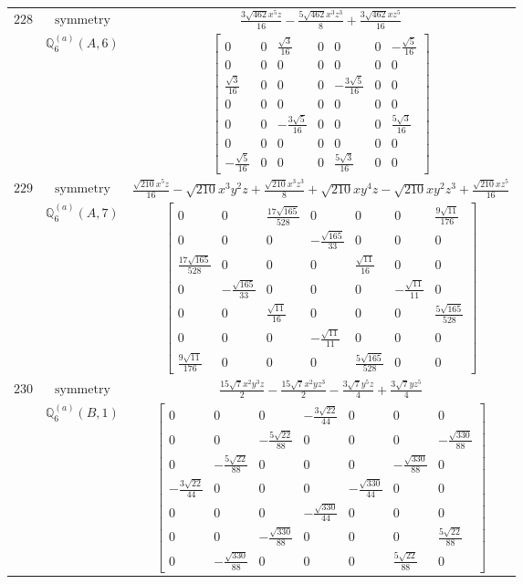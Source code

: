 \documentclass[fleqn,8pt,landscape]{jsarticle}
\begin{document}
\begin{longtable}{ccc}
$ 228 $ & $ \text{symmetry} $ & $ \frac{3 \sqrt{462} x^{5} z}{16} - \frac{5 \sqrt{462} x^{3} z^{3}}{8} + \frac{3 \sqrt{462} x z^{5}}{16} $ \\
$  $ & $ \mathbb{Q}_{6}^{(a)}(A,6) $ & $ \begin{bmatrix} 0 & 0 & \frac{\sqrt{3}}{16} & 0 & 0 & 0 & - \frac{\sqrt{5}}{16} \\ 0 & 0 & 0 & 0 & 0 & 0 & 0 \\ \frac{\sqrt{3}}{16} & 0 & 0 & 0 & - \frac{3 \sqrt{5}}{16} & 0 & 0 \\ 0 & 0 & 0 & 0 & 0 & 0 & 0 \\ 0 & 0 & - \frac{3 \sqrt{5}}{16} & 0 & 0 & 0 & \frac{5 \sqrt{3}}{16} \\ 0 & 0 & 0 & 0 & 0 & 0 & 0 \\ - \frac{\sqrt{5}}{16} & 0 & 0 & 0 & \frac{5 \sqrt{3}}{16} & 0 & 0 \end{bmatrix} $ \\ \hline
$ 229 $ & $ \text{symmetry} $ & $ \frac{\sqrt{210} x^{5} z}{16} - \sqrt{210} x^{3} y^{2} z + \frac{\sqrt{210} x^{3} z^{3}}{8} + \sqrt{210} x y^{4} z - \sqrt{210} x y^{2} z^{3} + \frac{\sqrt{210} x z^{5}}{16} $ \\
$  $ & $ \mathbb{Q}_{6}^{(a)}(A,7) $ & $ \begin{bmatrix} 0 & 0 & \frac{17 \sqrt{165}}{528} & 0 & 0 & 0 & \frac{9 \sqrt{11}}{176} \\ 0 & 0 & 0 & - \frac{\sqrt{165}}{33} & 0 & 0 & 0 \\ \frac{17 \sqrt{165}}{528} & 0 & 0 & 0 & \frac{\sqrt{11}}{16} & 0 & 0 \\ 0 & - \frac{\sqrt{165}}{33} & 0 & 0 & 0 & - \frac{\sqrt{11}}{11} & 0 \\ 0 & 0 & \frac{\sqrt{11}}{16} & 0 & 0 & 0 & \frac{5 \sqrt{165}}{528} \\ 0 & 0 & 0 & - \frac{\sqrt{11}}{11} & 0 & 0 & 0 \\ \frac{9 \sqrt{11}}{176} & 0 & 0 & 0 & \frac{5 \sqrt{165}}{528} & 0 & 0 \end{bmatrix} $ \\ \hline
$ 230 $ & $ \text{symmetry} $ & $ \frac{15 \sqrt{7} x^{2} y^{3} z}{2} - \frac{15 \sqrt{7} x^{2} y z^{3}}{2} - \frac{3 \sqrt{7} y^{5} z}{4} + \frac{3 \sqrt{7} y z^{5}}{4} $ \\
$  $ & $ \mathbb{Q}_{6}^{(a)}(B,1) $ & $ \begin{bmatrix} 0 & 0 & 0 & - \frac{3 \sqrt{22}}{44} & 0 & 0 & 0 \\ 0 & 0 & - \frac{5 \sqrt{22}}{88} & 0 & 0 & 0 & - \frac{\sqrt{330}}{88} \\ 0 & - \frac{5 \sqrt{22}}{88} & 0 & 0 & 0 & - \frac{\sqrt{330}}{88} & 0 \\ - \frac{3 \sqrt{22}}{44} & 0 & 0 & 0 & - \frac{\sqrt{330}}{44} & 0 & 0 \\ 0 & 0 & 0 & - \frac{\sqrt{330}}{44} & 0 & 0 & 0 \\ 0 & 0 & - \frac{\sqrt{330}}{88} & 0 & 0 & 0 & \frac{5 \sqrt{22}}{88} \\ 0 & - \frac{\sqrt{330}}{88} & 0 & 0 & 0 & \frac{5 \sqrt{22}}{88} & 0 \end{bmatrix} $ \\ \hline

\end{longtable}
\end{document}
